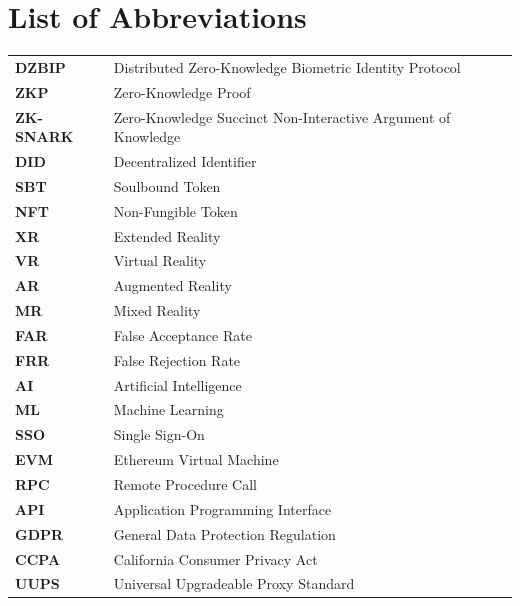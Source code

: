 \documentclass[12pt,a4paper,oneside]{report}
\begin{document}
\newpage

\tableofcontents
\listoffigures
\listoftables

\newpage
\chapter*{List of Abbreviations}
\begin{tabular}{ll}
    \textbf{DZBIP} & Distributed Zero-Knowledge Biometric Identity Protocol \\
    \textbf{ZKP} & Zero-Knowledge Proof \\
    \textbf{ZK-SNARK} & Zero-Knowledge Succinct Non-Interactive Argument of Knowledge \\
    \textbf{DID} & Decentralized Identifier \\
    \textbf{SBT} & Soulbound Token \\
    \textbf{NFT} & Non-Fungible Token \\
    \textbf{XR} & Extended Reality \\
    \textbf{VR} & Virtual Reality \\
    \textbf{AR} & Augmented Reality \\
    \textbf{MR} & Mixed Reality \\
    \textbf{FAR} & False Acceptance Rate \\
    \textbf{FRR} & False Rejection Rate \\
    \textbf{AI} & Artificial Intelligence \\
    \textbf{ML} & Machine Learning \\
    \textbf{SSO} & Single Sign-On \\
    \textbf{EVM} & Ethereum Virtual Machine \\
    \textbf{RPC} & Remote Procedure Call \\
    \textbf{API} & Application Programming Interface \\
    \textbf{GDPR} & General Data Protection Regulation \\
    \textbf{CCPA} & California Consumer Privacy Act \\
    \textbf{UUPS} & Universal Upgradeable Proxy Standard \\
\end{tabular}

\newpage
\end{document}
